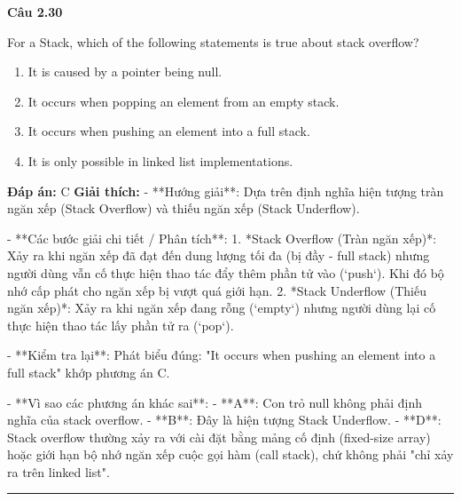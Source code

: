 \documentclass[11pt,a4paper]{article}
\newenvironment{question}[1]{%
  \par\vspace{1em}\noindent\textbf{\large Câu #1}\par\vspace{0.4em}
}{%
  \par\vspace{1em}\hrule\vspace{0.6em}
}
\newenvironment{choices}{%
  \begin{enumerate}[label=\textbf{\Alph*.},leftmargin=2.2em,itemsep=2pt,topsep=3pt]
}{%
  \end{enumerate}
}
\newcommand{\choice}{\item}
\begin{document}
\begin{question}{2.30}
For a Stack, which of the following statements is true about stack overflow?
\begin{choices}
\choice It is caused by a pointer being null.
\choice It occurs when popping an element from an empty stack.
\choice It occurs when pushing an element into a full stack.
\choice It is only possible in linked list implementations.
\end{choices}
\textbf{Đáp án:} C
\textbf{Giải thích:} - **Hướng giải**:
  Dựa trên định nghĩa hiện tượng tràn ngăn xếp (Stack Overflow) và thiếu ngăn xếp (Stack Underflow).

- **Các bước giải chi tiết / Phân tích**:
  1. *Stack Overflow (Tràn ngăn xếp)*: Xảy ra khi ngăn xếp đã đạt đến dung lượng tối đa (bị đầy - full stack) nhưng người dùng vẫn cố thực hiện thao tác đẩy thêm phần tử vào (`push`). Khi đó bộ nhớ cấp phát cho ngăn xếp bị vượt quá giới hạn.
  2. *Stack Underflow (Thiếu ngăn xếp)*: Xảy ra khi ngăn xếp đang rỗng (`empty`) nhưng người dùng lại cố thực hiện thao tác lấy phần tử ra (`pop`).

- **Kiểm tra lại**:
  Phát biểu đúng: "It occurs when pushing an element into a full stack" khớp phương án C.

- **Vì sao các phương án khác sai**:
  - **A**: Con trỏ null không phải định nghĩa của stack overflow.
  - **B**: Đây là hiện tượng Stack Underflow.
  - **D**: Stack overflow thường xảy ra với cài đặt bằng mảng cố định (fixed-size array) hoặc giới hạn bộ nhớ ngăn xếp cuộc gọi hàm (call stack), chứ không phải "chỉ xảy ra trên linked list".
\end{question}
\end{document}
